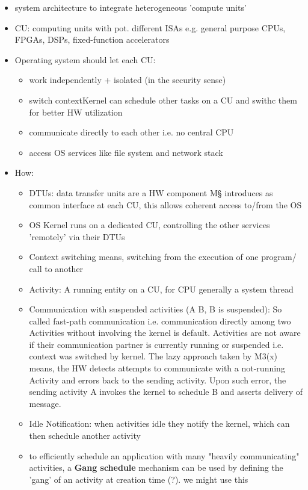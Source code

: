 \begin{itemize}
    \item system architecture to integrate heterogeneous 'compute units' 
    \item CU: computing units with pot. different ISAs e.g. general purpose CPUs, FPGAs, DSPs, fixed-function accelerators
    \item Operating system should let each CU: 
    \begin{itemize}
        \item work independently + isolated (in the security sense)
        \item switch context\means Kernel can schedule other tasks on a CU and swithc them for better HW utilization
        \item communicate directly to each other i.e. no central CPU
        \item access OS services like file system and network stack
    \end{itemize}
    \item How: 
    \begin{itemize}
        \item DTUs: data transfer units are a HW component M§ introduces as common interface at each CU, this allows coherent access to/from the OS
        \item OS Kernel runs on a dedicated CU, controlling the other services 'remotely' via their DTUs 
        \item Context switching means, switching from the execution of one program/ call to another 
        \item Activity: A running entity on a CU, for CPU generally a system thread
        \item Communication with suspended activities (A \means B, B is suspended): So called fast-path communication i.e. communication directly among two Activities without involving the kernel is default. Activities are not aware if their communication partner is currently running or suspended i.e. context was switched by kernel. The lazy approach taken by M3(x) means, the HW detects attempts to communicate with a not-running Activity and errors back to the sending activity. Upon such error, the sending activity A invokes the kernel to schedule B and asserts delivery of message. 
        \item Idle Notification: when activities idle they notify the kernel, which can then schedule another activity
        \item to efficiently schedule an application with many "heavily communicating" activities, a \textbf{Gang schedule} mechanism can be used  by defining the 'gang' of an activity at creation time (?). \means we might use this 

\end{itemize}
\end{itemize}

